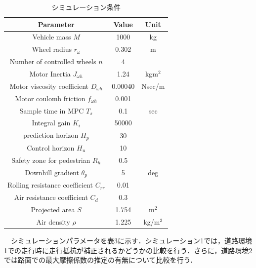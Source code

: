\begin{table}[htbp]
    \centering
    \caption{シミュレーション条件}
    \scalebox{0.87} {
        \begin{tabular}{|c|c|c|}
            \hline
            Parameter                                  & Value   & Unit     \\ \hline
            Vehicle mass $M$                           & 1000    & kg       \\ \hline
            Wheel radius $r_{\omega}$                  & 0.302   & m        \\ \hline
            Number of controlled wheels $n$            & 4       &          \\ \hline
            Motor Inertia $J_{\omega h}$               & 1.24    & kgm$^2$  \\ \hline
            Motor viscosity coefficient $D_{\omega h}$ & 0.00040 & Nsec/m   \\ \hline
            Motor coulomb friction $f_{\omega h}$      & 0.001   &          \\ \hline
            Sample time in MPC $T_s$                   & 0.1     & sec      \\ \hline
            Integral gain $K_i$                        & 50000   &          \\ \hline
            prediction horizon $H_p$                   & 30      &          \\ \hline
            Control horizon $H_u$                      & 10      &          \\ \hline
            Safety zone for pedestrian $R_h$           & 0.5     &          \\ \hline
            Downhill gradient $\theta_p$               & 5       & deg      \\ \hline
            Rolling resistance coefficient $C_{rr}$    & 0.01    &          \\ \hline
            Air resistance coefficient $C_d$           & 0.3     &          \\ \hline
            Projected area $S$                         & 1.754   & m$^2$    \\ \hline
            Air density $\rho$                         & 1.225   & kg/m$^3$ \\ \hline
        \end{tabular}
    }
\end{table}

　シミュレーションパラメータを表3に示す．シミュレーション1では，道路環境1での走行時に走行抵抗が補正されるかどうかの比較を行う．さらに，道路環境2では路面での最大摩擦係数の推定の有無について比較を行う．

